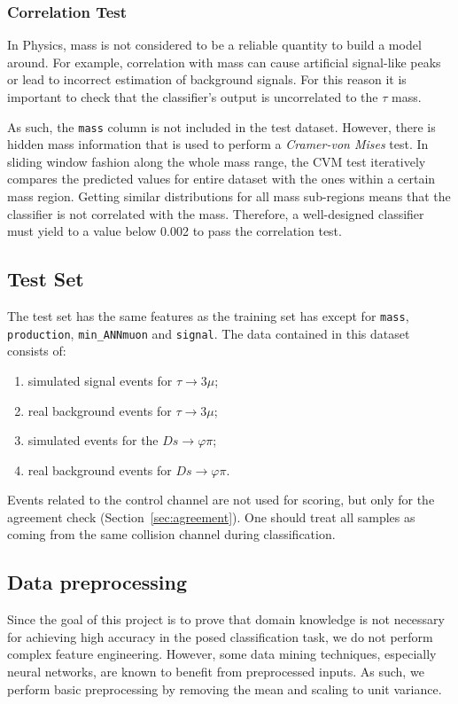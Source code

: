 \documentclass[conference]{IEEEtran}
\begin{document}
\subsubsection{Correlation Test}
\label{sec:correlation}
In Physics, mass is not considered to be a reliable quantity to build a model around. For example, correlation with mass can cause artificial signal-like peaks or lead to incorrect estimation of background signals. For this reason it is important to check that the classifier's output is uncorrelated to the $\tau$ mass.

As such, the \texttt{mass} column is not included in the test dataset. However, there is hidden mass information that is used to perform a \textit{Cramer-von Mises} test. In sliding window fashion along the whole mass range, the CVM test iteratively compares the predicted values for entire dataset with the ones within a certain mass region. Getting similar distributions for all mass sub-regions means that the classifier is not correlated with the mass. Therefore, a well-designed classifier must yield to a value below 0.002 to pass the correlation test.

\subsection{Test Set}
\label{sec:test-set}
The test set has the same features as the training set has except for
\texttt{mass}, \texttt{production}, \texttt{min\_ANNmuon} and \texttt{signal}.
The data contained in this dataset consists of:
\begin{enumerate}
	\item simulated signal events for $\tau \rightarrow 3\mu$;
	\item real background events for $\tau \rightarrow 3\mu$;
	\item simulated events for the $Ds \rightarrow \varphi\pi$;
	\item real background events for $Ds \rightarrow \varphi\pi$.
\end{enumerate}

Events related to the control channel are not used for scoring, but only for the
agreement check (Section~\ref{sec:agreement}). One should treat all samples as
coming from the same collision channel during classification.

\subsection{Data preprocessing}
Since the goal of this project is to prove that domain knowledge is not necessary for achieving high accuracy in the posed classification task, we do not perform complex feature engineering. However, some data mining techniques, especially neural networks, are known to benefit from preprocessed inputs. As such, we perform basic preprocessing by removing the mean and scaling to unit variance.
\end{document}
